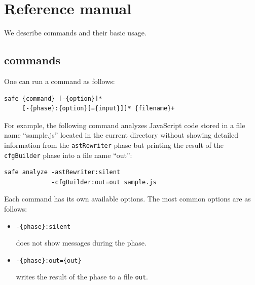 \chapter{Reference manual}
\label{c:3:refman}

We describe \safe commands and their basic usage.

\section{\safe commands}
One can run a \safe command as follows:
\begin{verbatim}
safe {command} [-{option}]*
     [-{phase}:{option}[={input}]]* {filename}+
\end{verbatim}
For example, the following command analyzes JavaScript code stored in a file name
``{sample.js}'' located in the current directory without showing detailed information
from the \verb!astRewriter! phase but printing the result of the \verb!cfgBuilder!
phase into a file name ``{out}'':
\begin{verbatim}
safe analyze -astRewriter:silent
             -cfgBuilder:out=out sample.js
\end{verbatim}

Each command has its own available options.  The most common options are as follows:
\begin{itemize}
\item \verb!-{phase}:silent!

\safe does not show messages during the phase.

\item \verb!-{phase}:out={out}!

\safe writes the result of the phase to a file \verb!out!.
\end{itemize}

